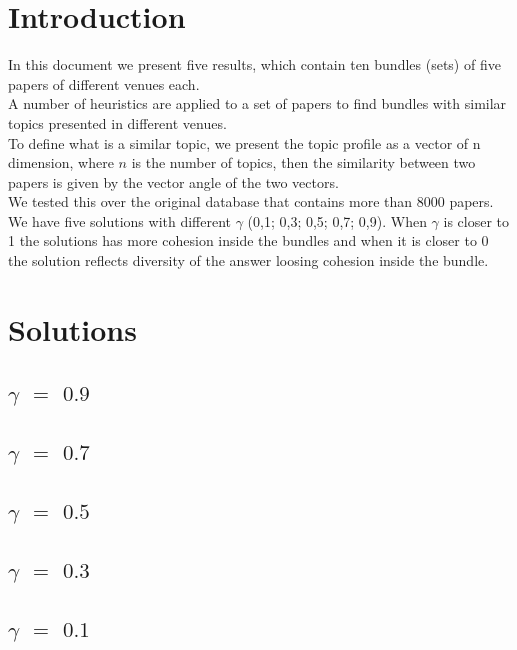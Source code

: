 \section{Introduction}
In this document we present five results, which contain ten bundles (sets) of five papers of 
different venues each.\\
A number of heuristics are applied to a set of papers to find bundles with similar topics presented 
in different venues.\\
To define what is a similar topic, we present the topic profile as a vector of n dimension, where 
$n$ is the number of topics, then the similarity between two papers is given by the vector angle of 
the two vectors.\\
We tested this over the original database that contains more than 8000 papers.\\
We have five solutions with different  $\gamma$ (0,1; 0,3; 0,5; 0,7; 0,9). When $\gamma$ is closer 
to 1 the solutions has more cohesion inside the bundles and when it is closer to 0 the solution 
reflects diversity of the answer loosing cohesion inside the bundle.

\cleardoublepage
\section{Solutions}
\subsection{$\gamma$ $=$ $0.9$}


\cleardoublepage
\subsection{$\gamma$ $=$ $0.7$}


\cleardoublepage
\subsection{$\gamma$ $=$ $0.5$}


\cleardoublepage
\subsection{$\gamma$ $=$ $0.3$}


\cleardoublepage
\subsection{$\gamma$ $=$ $0.1$}
